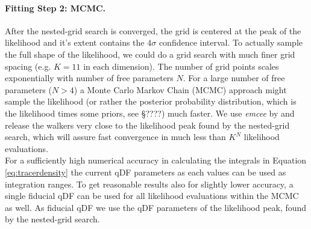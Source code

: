 \paragraph{Fitting Step 2: MCMC.} After the nested-grid search is converged, the grid is centered at the peak of the likelihood and it's extent contains the $4\sigma$ confidence interval. To actually sample the full shape of the likelihood, we could do a grid search with much finer grid spacing (e.g. $K=11$ in each dimension). The number of grid points scales exponentially with number of free parameters $N$. For a large number of free parameters ($N>4$) a Monte Carlo Markov Chain (MCMC) approach might sample the likelihood (or rather the posterior probability distribution, which is the likelihood times some priors, see \S ????) much faster. We use \emph{emcee} by \citet{for13} and release the walkers very close to the likelihood peak found by the nested-grid search, which will assure fast convergence in much less than $K^N$ likelihood evaluations.
\\For a sufficiently high numerical accuracy in calculating the integrals in Equation \ref{eq:tracerdensity} the current qDF parameters as each values can be used as integration ranges. To get reasonable results also for slightly lower accuracy, a single fiducial qDF can be used for all likelihood evaluations within the MCMC as well. As fiducial qDF we use the qDF parameters of the likelihood peak, found by the nested-grid search.
